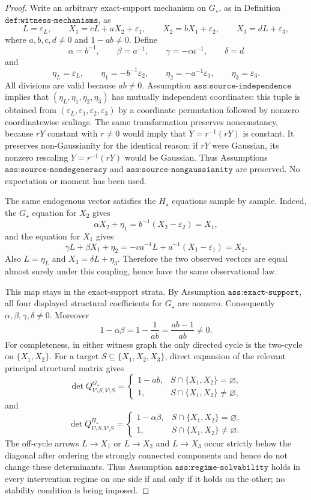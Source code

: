 \documentclass{article}
\begin{document}
\begin{proof}
Write an arbitrary exact-support mechanism on \(G_\star\), as in Definition \(\texttt{def:witness-mechanisms}\), as
\[
 L=\varepsilon_L,\qquad
 X_1=cL+aX_2+\varepsilon_1,\qquad
 X_2=bX_1+\varepsilon_2,\qquad
 X_3=dL+\varepsilon_3,
\]
where \(a,b,c,d\ne0\) and \(1-ab\ne0\). Define
\[
 \alpha=b^{-1},\qquad \beta=a^{-1},\qquad
 \gamma=-ca^{-1},\qquad \delta=d
\]
and
\[
 \eta_L=\varepsilon_L,\qquad
 \eta_1=-b^{-1}\varepsilon_2,\qquad
 \eta_2=-a^{-1}\varepsilon_1,\qquad
 \eta_3=\varepsilon_3.
\]
All divisions are valid because \(ab\ne0\). Assumption \(\texttt{ass:source-independence}\) implies that \((\eta_L,\eta_1,\eta_2,\eta_3)\) has mutually independent coordinates: this tuple is obtained from \((\varepsilon_L,\varepsilon_1,\varepsilon_2,\varepsilon_3)\) by a coordinate permutation followed by nonzero coordinatewise scalings. The same transformation preserves nonconstancy, because \(rY\) constant with \(r\ne0\) would imply that \(Y=r^{-1}(rY)\) is constant. It preserves non-Gaussianity for the identical reason: if \(rY\) were Gaussian, its nonzero rescaling \(Y=r^{-1}(rY)\) would be Gaussian. Thus Assumptions \(\texttt{ass:source-nondegeneracy}\) and \(\texttt{ass:source-nongaussianity}\) are preserved. No expectation or moment has been used.

The same endogenous vector satisfies the \(H_\star\) equations sample by sample. Indeed, the \(G_\star\) equation for \(X_2\) gives
\[
 \alpha X_2+\eta_1
 =b^{-1}(X_2-\varepsilon_2)
 =X_1,
\]
and the equation for \(X_1\) gives
\[
 \gamma L+\beta X_1+\eta_2
 =-ca^{-1}L+a^{-1}(X_1-\varepsilon_1)
 =X_2.
\]
Also \(L=\eta_L\) and \(X_3=\delta L+\eta_3\). Therefore the two observed vectors are equal almost surely under this coupling, hence have the same observational law.

This map stays in the exact-support strata. By Assumption \(\texttt{ass:exact-support}\), all four displayed structural coefficients for \(G_\star\) are nonzero. Consequently \(\alpha,\beta,\gamma,\delta\ne0\). Moreover
\[
 1-\alpha\beta
 =1-\frac{1}{ab}
 =\frac{ab-1}{ab}\ne0.
\]
For completeness, in either witness graph the only directed cycle is the two-cycle on \(\{X_1,X_2\}\). For a target \(S\subseteq\{X_1,X_2,X_3\}\), direct expansion of the relevant principal structural matrix gives
\[
 \det Q^{G_\star}_{V\setminus S,V\setminus S}
 =\begin{cases}
 1-ab,&S\cap\{X_1,X_2\}=\varnothing,\\[2pt]
 1,&S\cap\{X_1,X_2\}\ne\varnothing,
 \end{cases}
\]
and
\[
 \det Q^{H_\star}_{V\setminus S,V\setminus S}
 =\begin{cases}
 1-\alpha\beta,&S\cap\{X_1,X_2\}=\varnothing,\\[2pt]
 1,&S\cap\{X_1,X_2\}\ne\varnothing.
 \end{cases}
\]
The off-cycle arrows \(L\to X_1\) or \(L\to X_2\) and \(L\to X_3\) occur strictly below the diagonal after ordering the strongly connected components and hence do not change these determinants. Thus Assumption \(\texttt{ass:regime-solvability}\) holds in every intervention regime on one side if and only if it holds on the other; no stability condition is being imposed.


\end{proof}
\end{document}

